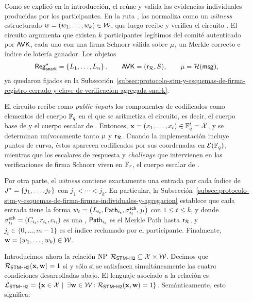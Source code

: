 
Como se explicó en la introducción, el \MithrilAggregator reúne y valida las evidencias individuales producidas por los participantes. En la ruta \Lagrange, las normaliza como un \textit{witness} estructurado $w = (w_1, \ldots, w_k) \in \mathcal{W}$, que luego recibe y verifica el circuito \HaloTwo. El circuito argumenta que existen $k$ participantes legítimos del comité autenticado por $\mathsf{AVK}$, cada uno con una firma Schnorr válida sobre $\mu$, un Merkle correcto e índice de lotería ganador. Los objetos
$$\mathsf{Reg}^{\star}_{\mathsf{snark}} = \left\{L_{1},\ldots,L_{n}\right\}, \qquad \mathsf{AVK} = (\mathsf{r}_{\mathcal{R}}, S), \qquad \mu = \mathcal{H}(\mathsf{msg}),$$
ya quedaron fijados en la Subsección~\ref{subsec:protocolo-stm-y-esquemas-de-firma-registro-cerrado-y-clave-de-verificacion-agregada-snark}.

El circuito recibe como \textit{public inputs} los componentes de \ProtocolMsg codificados como elementos del cuerpo $\mathbb{F}_q$ en el que se aritmetiza el circuito, es decir, el cuerpo base de \Jubjub y el cuerpo escalar de \BLS. Entonces, $\mathbf{x} = (x_1,\ldots,x_t) \in \mathbb{F}_q^t = \mathcal{X}$, y se determinan unívocamente tanto $\mu$ y $\mathsf{r}_{\mathcal{R}}$. Cuando la implementación incluye puntos de curva, éstos aparecen codificados por sus coordenadas en $\mathcal{E}(\mathbb{F}_q)$, mientras que los escalares de respuesta y \textit{challenge} que intervienen en las verificaciones de firma Schnorr viven en $\mathbb{F}_r$, el cuerpo escalar de \Jubjub.

Por otra parte, el \textit{witness} contiene exactamente una entrada por cada índice de $J^{\star} = \{j_1, \ldots, j_k\}$ con $j_1 < \cdots < j_k$. En particular, la Subsección~\ref{subsec:protocolo-stm-y-esquemas-de-firma-firmas-individuales-y-agregacion} establece que cada entrada tiene la forma $w_t = \left(L_{i_t}, \mathsf{Path}_{i_t}, \sigma^{\mathsf{sch}}_{i_t}, j_t\right)$ con $1 \leq t \leq k$, y donde $\sigma^{\mathsf{sch}}_{i_t} = (C_{i_t},r_{i_t},c_{i_t})$ es una \UniqueSchnorrSignature, $\mathsf{Path}_{i_t}$ es el Merkle Path hasta $\mathsf{r}_{\mathcal{R}}$, y $j_t \in \{0, \ldots, m - 1\}$ es el índice reclamado por el participante. Finalmente, $\mathbf{w} = (w_1, \ldots, w_k) \in \mathcal{W}$.

Introducimos ahora la relación $\mathrm{NP}$ $\mathcal{R}_{\mathsf{STM\mbox{-}H2}} \subseteq \mathcal{X} \times \mathcal{W}$. Decimos que $\mathcal{R}_{\mathsf{STM\mbox{-}H2}}(\mathbf{x}, \mathbf{w}) = 1$ si y sólo si se satisfacen simultáneamente las cuatro condiciones desarrolladas abajo. El lenguaje asociado a la relación es $\mathcal{L}_{\mathsf{STM\mbox{-}H2}} = \left\{\mathbf{x} \in \mathcal{X} \mid \; \exists \mathbf{w} \in \mathcal{W}:  \mathcal{R}_{\mathsf{STM\mbox{-}H2}}(\mathbf{x}, \mathbf{w}) = 1 \right\}$. Semánticamente, esto significa:

